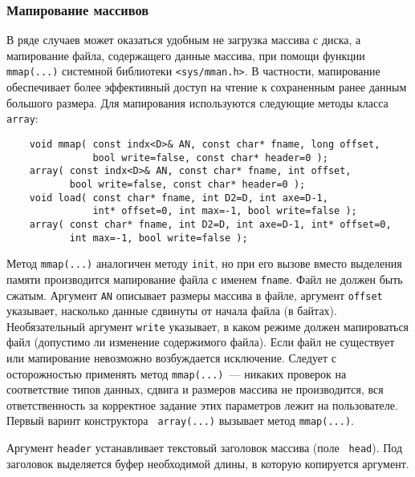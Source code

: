 \subsubsection{Мапирование массивов}
В ряде случаев может оказаться удобным не загрузка массива с диска, а
мапирование файла, содержащего данные массива, при помощи функции {\tt
  mmap(...)} системной библиотеки {\tt <sys/mman.h>}. В частности, мапирование
обеспечивает более эффективный доступ на чтение к сохраненным ранее данным
большого размера. Для мапирования используются следующие методы класса {\tt array}:
\begin{verbatim}
    void mmap( const indx<D>& AN, const char* fname, long offset, 
               bool write=false, const char* header=0 );
    array( const indx<D>& AN, const char* fname, int offset, 
           bool write=false, const char* header=0 );
    void load( const char* fname, int D2=D, int axe=D-1, 
               int* offset=0, int max=-1, bool write=false );
    array( const char* fname, int D2=D, int axe=D-1, int* offset=0, 
           int max=-1, bool write=false );
\end{verbatim}
Метод {\tt mmap(...)} аналогичен методу {\tt init}, но при его вызове вместо
выделения памяти производится мапирование файла с именем {\tt fname}. Файл не
должен быть сжатым. Аргумент {\tt AN} описывает размеры массива в файле,
аргумент {\tt offset} указывает, насколько данные сдвинуты от начала файла (в
байтах). Необязательный аргумент {\tt write} указывает, в каком режиме должен мапироваться
файл (допустимо ли изменение содержимого файла). Если файл не существует или
мапирование невозможно возбуждается исключение. Следует с осторожностью
применять метод {\tt mmap(...)}~--- никаких проверок на соответствие типов
данных, сдвига и размеров массива не производится, вся ответственность за
корректное задание этих параметров лежит на пользователе. Первый варинт конструктора {\tt
  array(...)} вызывает метод {\tt mmap(...)}. 

Аргумент {\tt header} устанавливает текстовый заголовок массива (поле {\tt
  head}). Под заголовок выделяется буфер необходимой длины, в которую
копируется аргумент.

